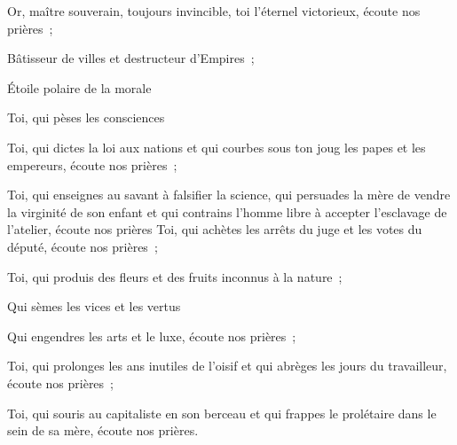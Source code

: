 \documentclass[french,twoside]{book} %
\newcommand{\astermono}{\medskip\centerline{\color{rubric}\large\selectfont{\syms ✻}}\medskip\par}%
\begin{document}
\noindent Or, maître souverain, toujours invincible, toi l’éternel victorieux, écoute nos prières ;\par
Bâtisseur de villes et destructeur d’Empires ;\par
Étoile polaire de la morale\par
Toi, qui pèses les consciences\par
Toi, qui dictes la loi aux nations et qui courbes sous ton joug les papes et les empereurs, écoute nos prières ;\par
Toi, qui enseignes au savant à falsifier la science, qui persuades la mère de vendre la virginité de son enfant et qui contrains l’homme libre à accepter l’esclavage de l’atelier, écoute nos prières Toi, qui achètes les arrêts du juge et les votes du député, écoute nos prières ;\par
Toi, qui produis des fleurs et des fruits inconnus à la nature ;\par
Qui sèmes les vices et les vertus\par
Qui engendres les arts et le luxe, écoute nos prières ;\par
Toi, qui prolonges les ans inutiles de l’oisif et qui abrèges les jours du travailleur, écoute nos prières ;\par
Toi, qui souris au capitaliste en son berceau et qui frappes le prolétaire dans le sein de sa mère, écoute nos prières.\par

\astermono
\end{document}
